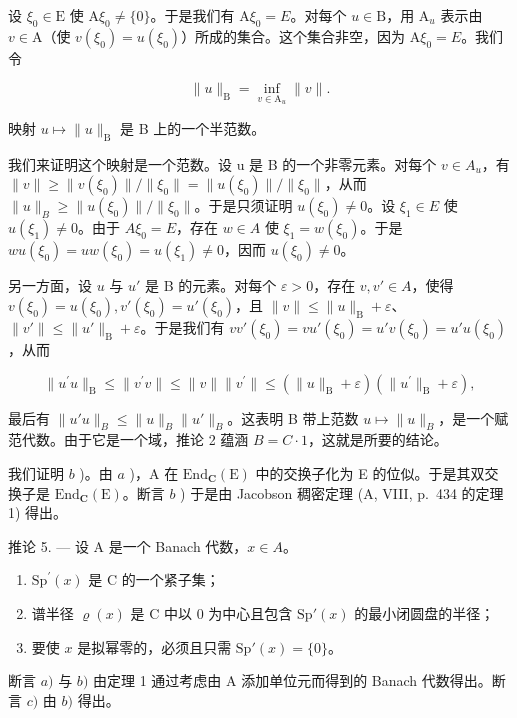 设 \(\xi_0\in \mathrm{E}\) 使 \(\mathrm{A}\xi_0\neq\{0\}\)。于是我们有 \(\mathrm{A}\xi_0 = E\)。对每个 \(u\in \mathrm{B}\)，用 \(\mathrm{A}_u\) 表示由 \(v\in \mathrm{A}\)（使 \(v(\xi_0) = u(\xi_0)\)）所成的集合。这个集合非空，因为 \(\mathrm{A}\xi_0 = E\)。我们令

\[
\| u \| _ {\mathrm{B}} = \inf _ {v \in \mathrm{A} _ {u}} \| v \|.
\]

映射 \(u \mapsto \|u\|_{\mathrm{B}}\) 是 B 上的一个半范数。

我们来证明这个映射是一个范数。设 u 是 B 的一个非零元素。对每个 \(v \in A_{u}\)，有 \(\|v\| \geqslant \|v(\xi_{0})\|/\|\xi_{0}\| = \|u(\xi_{0})\|/\|\xi_{0}\|\)，从而 \(\|u\|_{B} \geqslant \|u(\xi_{0})\|/\|\xi_{0}\|\)。于是只须证明 \(u(\xi_{0}) \neq 0\)。设 \(\xi_{1} \in E\) 使 \(u(\xi_{1}) \neq 0\)。由于 \(A\xi_{0} = E\)，存在 \(w \in A\) 使 \(\xi_{1} = w(\xi_{0})\)。于是 \(wu(\xi_{0}) = uw(\xi_{0}) = u(\xi_{1}) \neq 0\)，因而 \(u(\xi_{0}) \neq 0\)。

另一方面，设 \(u\) 与 \(u'\) 是 B 的元素。对每个 \(\varepsilon > 0\)，存在 \(v, v' \in A\)，使得 \(v(\xi_0) = u(\xi_0), v'(\xi_0) = u'(\xi_0)\)，且 \(\|v\| \leqslant \|u\|_{\mathrm{B}} + \varepsilon\)、\(\|v'\| \leqslant \|u'\|_{\mathrm{B}} + \varepsilon\)。于是我们有 \(vv'(\xi_0) = vu'(\xi_0) = u'v(\xi_0) = u'u(\xi_0)\)，从而

\[
\| u ^ {\prime} u \| _ {\mathrm{B}} \leqslant \| v ^ {\prime} v \| \leqslant \| v \| \| v ^ {\prime} \| \leqslant (\| u \| _ {\mathrm{B}} + \varepsilon) (\| u ^ {\prime} \| _ {\mathrm{B}} + \varepsilon),
\]

最后有 \(\|u'u\|_{B} \leqslant \|u\|_{B} \|u'\|_{B}\)。这表明 B 带上范数 \(u \mapsto \|u\|_{B}\)，是一个赋范代数。由于它是一个域，推论 2 蕴涵 \(B = C \cdot 1\)，这就是所要的结论。

我们证明 \(b\) )。由 \(a\) )，A 在 \(\mathrm{End}_{\mathbf{C}}(\mathrm{E})\) 中的交换子化为 E 的位似。于是其双交换子是 \(\mathrm{End}_{\mathbf{C}}(\mathrm{E})\)。断言 \(b\) ) 于是由 Jacobson 稠密定理 (A, VIII, p.~434 的定理 1) 得出。

推论 5. --- 设 A 是一个 Banach 代数，\(x \in A\)。

\begin{enumerate}
\def\labelenumi{\alph{enumi})}
\item
  \(\mathrm{Sp}^{\prime}(x)\) 是 C 的一个紧子集；
\item
  谱半径 \(\varrho(x)\) 是 C 中以 0 为中心且包含 \(\mathrm{Sp}'(x)\) 的最小闭圆盘的半径；
\item
  要使 \(x\) 是拟幂零的，必须且只需 \(\mathrm{Sp}'(x) = \{0\}\)。
\end{enumerate}

断言 \(a)\) 与 \(b)\) 由定理 1 通过考虑由 A 添加单位元而得到的 Banach 代数得出。断言 \(c)\) 由 \(b)\) 得出。

